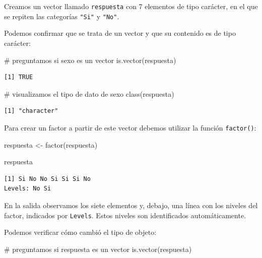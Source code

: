 \documentclass[
  spanish,
  letterpaper,
  DIV=11,
  numbers=noendperiod]{scrreprt}
\newenvironment{Shaded}{\begin{snugshade}}{\end{snugshade}}
\newcommand{\CommentTok}[1]{\textcolor[rgb]{0.37,0.37,0.37}{#1}}
\newcommand{\FunctionTok}[1]{\textcolor[rgb]{0.28,0.35,0.67}{#1}}
\newcommand{\NormalTok}[1]{\textcolor[rgb]{0.00,0.23,0.31}{#1}}
\newcommand{\OtherTok}[1]{\textcolor[rgb]{0.00,0.23,0.31}{#1}}
\begin{document}
Creamos un vector llamado \texttt{respuesta} con 7 elementos de tipo
carácter, en el que se repiten las categorías \texttt{"Si"} y
\texttt{"No"}.

Podemos confirmar que se trata de un vector y que su contenido es de
tipo carácter:

\begin{Shaded}
\begin{Highlighting}[]
\CommentTok{\# preguntamos si sexo es un vector}
\FunctionTok{is.vector}\NormalTok{(respuesta)}
\end{Highlighting}
\end{Shaded}

\begin{verbatim}
[1] TRUE
\end{verbatim}

\begin{Shaded}
\begin{Highlighting}[]
\CommentTok{\# visualizamos el tipo de dato de sexo}
\FunctionTok{class}\NormalTok{(respuesta)}
\end{Highlighting}
\end{Shaded}

\begin{verbatim}
[1] "character"
\end{verbatim}

Para crear un factor a partir de este vector debemos utilizar la función
\texttt{factor()}:

\begin{Shaded}
\begin{Highlighting}[]
\NormalTok{respuesta }\OtherTok{\textless{}{-}} \FunctionTok{factor}\NormalTok{(respuesta)}

\NormalTok{respuesta}
\end{Highlighting}
\end{Shaded}

\begin{verbatim}
[1] Si No No Si Si Si No
Levels: No Si
\end{verbatim}

En la salida observamos los siete elementos y, debajo, una línea con los
niveles del factor, indicados por \texttt{Levels}. Estos niveles son
identificados automáticamente.

Podemos verificar cómo cambió el tipo de objeto:

\begin{Shaded}
\begin{Highlighting}[]
\CommentTok{\# preguntamos si respuesta es un vector}
\FunctionTok{is.vector}\NormalTok{(respuesta)}
\end{Highlighting}
\end{Shaded}
\end{document}
